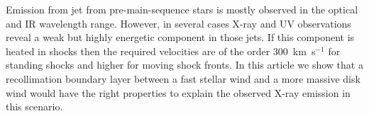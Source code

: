 Emission from jet from pre-main-sequence stars is mostly observed in the optical and IR wavelength range. However, in several cases X-ray and UV observations reveal a weak but highly energetic component in those jets. If this component is heated in shocks then the required velocities are of the order 300~km~s$^{-1}$ for standing shocks and higher for moving shock fronts. In this article we show that a recollimation boundary layer between a fast stellar wind and a more massive disk wind would have the right properties to explain the observed X-ray emission in this scenario.
